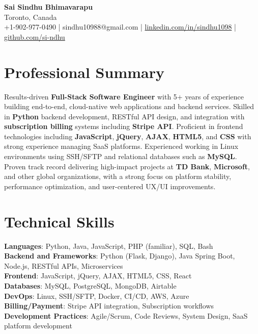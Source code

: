 \documentclass[letterpaper,11pt]{article}
\begin{document}
\begin{center}
  {\Large \textbf{Sai Sindhu Bhimavarapu}} \\
  Toronto, Canada \\
  +1-902-977-0490 \enspace | \enspace sindhu10988@gmail.com \enspace | \enspace \href{https://www.linkedin.com/in/sindhu1098/}{linkedin.com/in/sindhu1098} \enspace | \enspace \href{https://github.com/si-ndhu}{github.com/si-ndhu}
\end{center}

\section{Professional Summary}
  \begin{itemize}[leftmargin=0.15in, label={}]
    \small{\item{
     Results-driven \textbf{Full-Stack Software Engineer} with 5+ years of experience building end-to-end, cloud-native web applications and backend services. Skilled in \textbf{Python} backend development, RESTful API design, and integration with \textbf{subscription billing} systems including \textbf{Stripe API}. Proficient in frontend technologies including \textbf{JavaScript}, \textbf{jQuery}, \textbf{AJAX}, \textbf{HTML5}, and \textbf{CSS} with strong experience managing SaaS platforms. Experienced working in Linux environments using SSH/SFTP and relational databases such as \textbf{MySQL}. Proven track record delivering high-impact projects at \textbf{TD Bank}, \textbf{Microsoft}, and other global organizations, with a strong focus on platform stability, performance optimization, and user-centered UX/UI improvements.
    }}
  \end{itemize}
\vspace{-16pt}

\section{Technical Skills}
 \begin{itemize}[leftmargin=0.15in, label={}]
    \small{\item{
     \textbf{Languages}: Python, Java, JavaScript, PHP (familiar), SQL, Bash \\
     \textbf{Backend and Frameworks}: Python (Flask, Django), Java Spring Boot, Node.js, RESTful APIs, Microservices \\
     \textbf{Frontend}: JavaScript, jQuery, AJAX, HTML5, CSS, React \\
     \textbf{Databases}: MySQL, PostgreSQL, MongoDB, Airtable \\
     \textbf{DevOps}: Linux, SSH/SFTP, Docker, CI/CD, AWS, Azure \\
     \textbf{Billing/Payment}: Stripe API integration, Subscription workflows \\
     \textbf{Development Practices}: Agile/Scrum, Code Reviews, System Design, SaaS platform development \\
    }}
 \end{itemize}
\vspace{-16pt}
\end{document}
